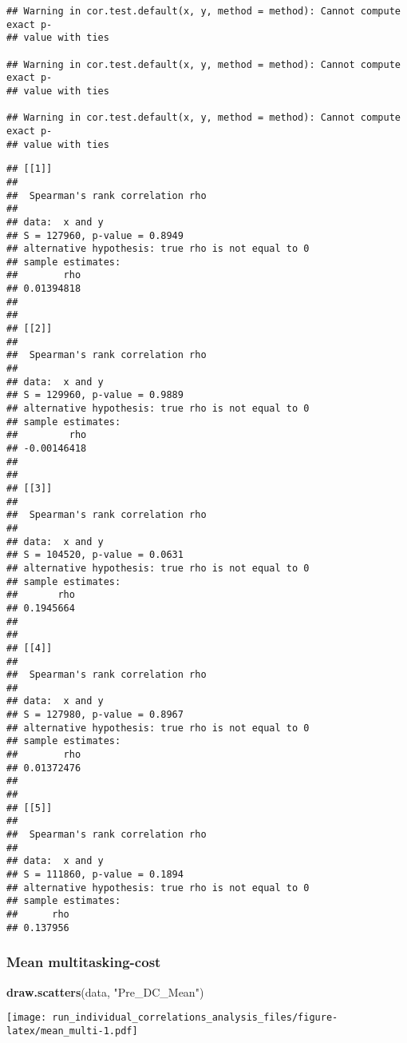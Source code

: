 \documentclass[]{article}
\newenvironment{Shaded}{\begin{snugshade}}{\end{snugshade}}
\newcommand{\KeywordTok}[1]{\textcolor[rgb]{0.13,0.29,0.53}{\textbf{#1}}}
\newcommand{\DataTypeTok}[1]{\textcolor[rgb]{0.13,0.29,0.53}{#1}}
\newcommand{\StringTok}[1]{\textcolor[rgb]{0.31,0.60,0.02}{#1}}
\newcommand{\OperatorTok}[1]{\textcolor[rgb]{0.81,0.36,0.00}{\textbf{#1}}}
\newcommand{\NormalTok}[1]{#1}
\begin{document}
\begin{verbatim}
## Warning in cor.test.default(x, y, method = method): Cannot compute exact p-
## value with ties

## Warning in cor.test.default(x, y, method = method): Cannot compute exact p-
## value with ties

## Warning in cor.test.default(x, y, method = method): Cannot compute exact p-
## value with ties
\end{verbatim}

\begin{verbatim}
## [[1]]
## 
##  Spearman's rank correlation rho
## 
## data:  x and y
## S = 127960, p-value = 0.8949
## alternative hypothesis: true rho is not equal to 0
## sample estimates:
##        rho 
## 0.01394818 
## 
## 
## [[2]]
## 
##  Spearman's rank correlation rho
## 
## data:  x and y
## S = 129960, p-value = 0.9889
## alternative hypothesis: true rho is not equal to 0
## sample estimates:
##         rho 
## -0.00146418 
## 
## 
## [[3]]
## 
##  Spearman's rank correlation rho
## 
## data:  x and y
## S = 104520, p-value = 0.0631
## alternative hypothesis: true rho is not equal to 0
## sample estimates:
##       rho 
## 0.1945664 
## 
## 
## [[4]]
## 
##  Spearman's rank correlation rho
## 
## data:  x and y
## S = 127980, p-value = 0.8967
## alternative hypothesis: true rho is not equal to 0
## sample estimates:
##        rho 
## 0.01372476 
## 
## 
## [[5]]
## 
##  Spearman's rank correlation rho
## 
## data:  x and y
## S = 111860, p-value = 0.1894
## alternative hypothesis: true rho is not equal to 0
## sample estimates:
##      rho 
## 0.137956
\end{verbatim}

\subsubsection{Mean multitasking-cost}\label{mean-multitasking-cost}

\begin{Shaded}
\begin{Highlighting}[]
\KeywordTok{draw.scatters}\NormalTok{(data, }\StringTok{"Pre_DC_Mean"}\NormalTok{)}
\end{Highlighting}
\end{Shaded}

\texttt{[image: run\_individual\_correlations\_analysis\_files/figure-latex/mean\_multi-1.pdf]}

\begin{Shaded}
\end{Shaded}
\end{document}
